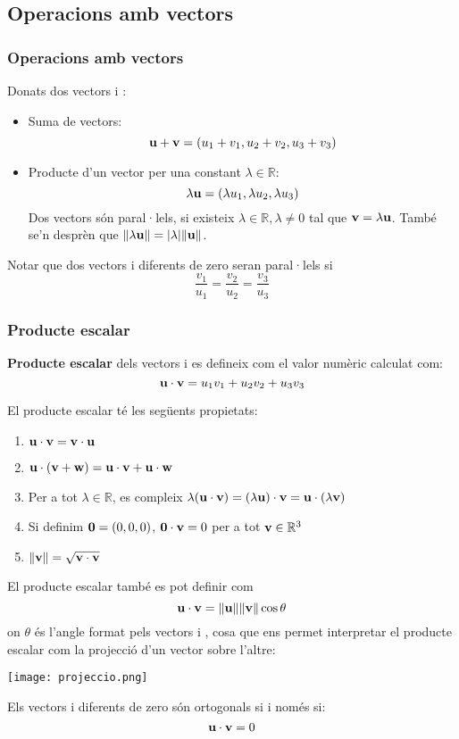 \documentclass{beamer}
\begin{document}
\subsection{Operacions amb vectors}
\begin{frame}
  \frametitle{Operacions amb vectors}
  Donats dos vectors  i :
  \begin{itemize}
    \item Suma de vectors: \[\textbf{u}+\textbf{v}=(u_1+v_1,u_2+v_2,u_3+v_3)\]
    \item Producte d'un vector per una constant $\lambda \in \mathbb{R}$:
    \[\lambda \textbf{u} = (\lambda u_1, \lambda u_2, \lambda u_3)\]
    Dos vectors són paral·lels, si existeix $\lambda \in \mathbb{R}, \lambda \neq 0$ tal que $\textbf{v}=\lambda \textbf{u}$. També se'n desprèn que $\norm{\lambda \textbf{u}}=\abs{\lambda} \norm{\textbf{u}}$.
  \end{itemize}
  Notar que dos vectors  i  diferents de zero seran paral·lels si
  \[\frac{v_1}{u_1}=\frac{v_2}{u_2}=\frac{v_3}{u_3}\]
\end{frame}
\begin{frame}[allowframebreaks]
  \frametitle{Producte escalar}
  \begin{definicio}
    {\bf Producte escalar} dels vectors  i  es defineix com el valor numèric calculat com:
  \[\textbf{u} \cdot \textbf{v} = u_1v_1+u_2v_2+u_3v_3\]
  \end{definicio}

  El producte escalar té les següents propietats:
  \begin{enumerate}
    \item $\textbf{u} \cdot \textbf{v} = \textbf{v} \cdot \textbf{u}$
    \item $\textbf{u} \cdot (\textbf{v}+ \textbf{w}) = \textbf{u} \cdot \textbf{v} + \textbf{u} \cdot \textbf{w}$
    \item Per a tot $\lambda \in \mathbb{R}$, es compleix $\lambda (\textbf{u}\cdot \textbf{v})= (\lambda \textbf{u})\cdot \textbf{v}=\textbf{u}\cdot(\lambda \textbf{v})$
    \item Si definim $\textbf{0}=(0,0,0)$, $\textbf{0} \cdot \textbf{v} = 0$ per a tot $\textbf{v}\in\mathbb{R}^3$
    \item $\norm{\textbf{v}}=\sqrt{\textbf{v}\cdot \textbf{v}}$
  \end{enumerate}
  \framebreak
  El producte escalar també es pot definir com
  \[
    \textbf{u}\cdot \textbf{v} = \norm{\textbf{u}}\norm{\textbf{v}} \cos{\theta}
  \]
  on $\theta$ és l'angle format pels vectors  i , cosa que ens permet interpretar el producte escalar com la projecció d'un vector sobre l'altre:\cite{mcorbera}
  \begin{center}
    \texttt{[image: projeccio.png]}
  \end{center}

  Els vectors  i  diferents de zero són ortogonals si i només si:
  \[
    \textbf{u}\cdot \textbf{v}=0
  \]
\end{frame}
\end{document}
